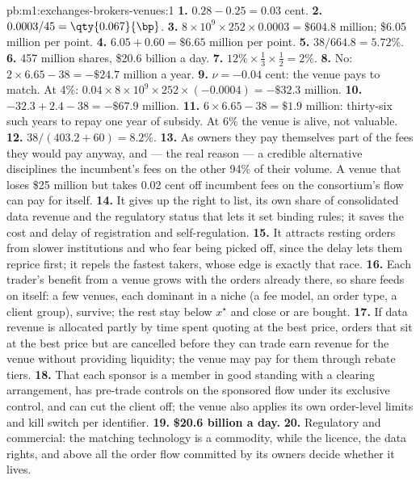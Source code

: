 \begin{solution}{pb:m1:exchanges-brokers-venues:1}
\textbf{1.} $0.28 - 0.25 = 0.03$ cent.
\textbf{2.} $0.0003/45 = \qty{0.067}{\bp}$.
\textbf{3.} $8\times10^9 \times 252 \times 0.0003 = \$604.8$ million; \$6.05
million per point.
\textbf{4.} $6.05 + 0.60 = \$6.65$ million per point.
\textbf{5.} $38/664.8 = 5.72\%$.
\textbf{6.} 457 million shares, \$20.6 billion a day.
\textbf{7.} $12\% \times \tfrac13 \times \tfrac12 = 2\%$.
\textbf{8.} No: $2 \times 6.65 - 38 = -\$24.7$ million a year.
\textbf{9.} $\nu = -0.04$ cent: the venue pays to match. At 4\%:
$0.04 \times 8\times10^9 \times 252 \times (-0.0004) = -\$32.3$ million.
\textbf{10.} $-32.3 + 2.4 - 38 = -\$67.9$ million.
\textbf{11.} $6 \times 6.65 - 38 = \$1.9$ million: thirty-six such years to
repay one year of subsidy. At 6\% the venue is alive, not valuable.
\textbf{12.} $38/(403.2 + 60) = 8.2\%$.
\textbf{13.} As owners they pay themselves part of the fees they would pay
anyway, and --- the real reason --- a credible alternative disciplines the
incumbent's fees on the other 94\% of their volume. A venue that loses
\$25 million but takes 0.02 cent off incumbent fees on the consortium's flow
can pay for itself.
\textbf{14.} It gives up the right to list, its own share of consolidated
data revenue and the regulatory status that lets it set binding rules; it
saves the cost and delay of  registration and self-regulation.
\textbf{15.} It attracts resting orders from slower institutions and  who fear being picked off, since the delay lets them reprice first; it
repels the fastest takers, whose edge is exactly that race.
\textbf{16.} Each trader's benefit from a venue grows with the orders already
there, so share feeds on itself: a few venues, each dominant in a niche
(a fee model, an order type, a client group), survive; the rest stay below
$x^\star$ and close or are bought.
\textbf{17.} If data revenue is allocated partly by time spent quoting at
the best price, orders that sit at the best price but are cancelled before
they can trade earn revenue for the venue without providing liquidity; the
venue may pay for them through rebate tiers.
\textbf{18.} That each sponsor is a member in good standing with a clearing
arrangement, has pre-trade controls on the sponsored flow under its exclusive
control, and can cut the client off; the venue also applies its own
order-level limits and kill switch per identifier.
\textbf{19.} \textbf{\$20.6 billion a day.}
\textbf{20.} Regulatory and commercial: the matching technology is a
commodity, while the licence, the data rights, and above all the order flow
committed by its owners decide whether it lives.
\end{solution}

